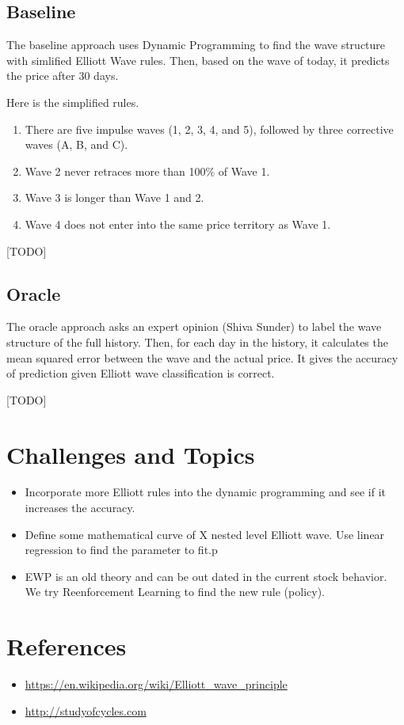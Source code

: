 \documentclass[12pt]{article}
\begin{document}
\subsection{Baseline}

The baseline approach uses Dynamic Programming to find the wave
structure with simlified Elliott Wave rules. Then, based on the wave
of today, it predicts the price after 30 days.

Here is the simplified rules.

\begin{enumerate}
 \item There are five impulse waves (1, 2, 3, 4, and 5), followed by
   three corrective waves (A, B, and C).
 \item Wave 2 never retraces more than 100\% of Wave 1.
 \item Wave 3 is longer than Wave 1 and 2. 
 \item Wave 4 does not enter into the same price territory as Wave 1.
\end{enumerate}

[TODO] 

\subsection{Oracle}

The oracle approach asks an expert opinion (Shiva Sunder) to label the
wave structure of the full history. Then, for each day in the history,
it calculates the mean squared error between the wave and the actual
price. It gives the accuracy of prediction given Elliott wave
classification is correct.

[TODO] 

\section{Challenges and Topics}

\begin{itemize}
\item Incorporate more Elliott rules into the dynamic programming and
  see if it increases the accuracy.
\item Define some mathematical curve of X nested level Elliott
  wave. Use linear regression to find the parameter to fit.p
\item EWP is an old theory and can be out dated in the current stock
  behavior. We try Reenforcement Learning to find the new rule
  (policy).
\end{itemize}

\section*{References}

\begin{itemize}
\item \url{https://en.wikipedia.org/wiki/Elliott_wave_principle}
\item \url{http://studyofcycles.com}
\end{itemize}
     
\end{document}
